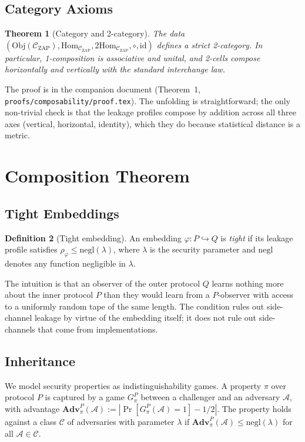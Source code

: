 \documentclass[11pt]{article}
\newtheorem{theorem}{Theorem}
\theoremstyle{definition}
\newtheorem{definition}[theorem]{Definition}
\theoremstyle{remark}
\newcommand{\CZ}{\mathcal{C}_{\mathrm{ZAP}}}
\newcommand{\Adv}{\mathbf{Adv}}
\begin{document}
\subsection{Category Axioms}

\begin{theorem}[Category and 2-category]
\label{thm:cat}
The data $(\mathrm{Obj}(\CZ), \mathrm{Hom}_{\CZ}, \mathrm{2Hom}_{\CZ},
\circ, \mathrm{id})$ defines a strict 2-category. In particular,
1-composition is associative and unital, and 2-cells compose
horizontally and vertically with the standard interchange law.
\end{theorem}

The proof is in the companion document
(Theorem~1, \texttt{proofs/composability/proof.tex}). The unfolding is straightforward; the only
non-trivial check is that the leakage profiles compose by addition
across all three axes (vertical, horizontal, identity), which they
do because statistical distance is a metric.

\section{Composition Theorem}
\label{sec:composition}

\subsection{Tight Embeddings}

\begin{definition}[Tight embedding]
\label{def:tight}
An embedding $\varphi : P \hookrightarrow Q$ is \emph{tight} if its
leakage profile satisfies $\rho_\varphi \le \mathrm{negl}(\lambda)$,
where $\lambda$ is the security parameter and $\mathrm{negl}$ denotes
any function negligible in $\lambda$.
\end{definition}

The intuition is that an observer of the outer protocol $Q$ learns
nothing more about the inner protocol $P$ than they would learn from
a $P$-observer with access to a uniformly random tape of the same
length. The condition rules out side-channel leakage by virtue of the
embedding itself; it does not rule out side-channels that come from
implementations.

\subsection{Inheritance}

We model security properties as indistinguishability games. A property
$\pi$ over protocol $P$ is captured by a game $G_\pi^P$ between a
challenger and an adversary $\mathcal{A}$, with advantage
$\Adv_\pi^P(\mathcal{A}) := |\Pr[G_\pi^P(\mathcal{A}) = 1] - 1/2|$.
The property holds against a class $\mathcal{C}$ of adversaries with
parameter $\lambda$ if $\Adv_\pi^P(\mathcal{A}) \le
\mathrm{negl}(\lambda)$ for all $\mathcal{A} \in \mathcal{C}$.
\end{document}

